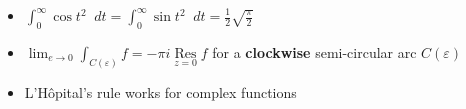 \documentclass[10pt,landscape,a4paper]{article}
\DeclareMathOperator{\Res}{Res}
\newcommand{\res}[2]{\underset{#2}{\Res} #1 }
\renewcommand{\epsilon}{\varepsilon}
\newcommand*\dif{\mathop{}\!d}
\begin{document}
\begin{multicols*}{5}
\begin{itemize}
  \item $\int_{0}^{\infty} \cos t^2 \dif{t} = \int_{0}^{\infty} \sin t^2 \dif{t} = \frac{1}{2} \sqrt{\frac{\pi}{2} }$
  \item $\lim_{e \to 0} \int_{C(\epsilon)} f = - \pi i \res{f}{z = 0}$ for a \textbf{clockwise} semi-circular arc $C(\epsilon)$
  \item L'H\^opital's rule works for complex functions
\end{itemize}



$ $ \\
$ $ \\
$ $ \\
$ $ \\
$ $ \\
$ $ \\
$ $ \\
$ $ \\
$ $ \\
$ $ \\
$ $ \\
$ $ \\
$ $ \\
$ $ \\
$ $ \\
$ $ \\
$ $ \\
$ $ \\
$ $ \\
$ $ \\
$ $ \\
$ $ \\
$ $ \\
$ $ \\
$ $ \\
$ $ \\
$ $ \\
$ $ \\
$ $ \\
$ $ \\
$ $ \\
$ $ \\
$ $ \\
$ $ \\
$ $ \\
$ $ \\
$ $ \\
$ $ \\
$ $ \\
$ $ \\
$ $ \\
$ $ \\
$ $ \\
$ $ \\
$ $ \\
$ $ \\
$ $ \\
$ $ \\
$ $ \\
$ $ \\

\end{multicols*}
\end{document}
